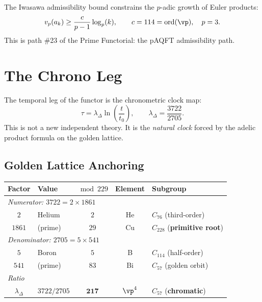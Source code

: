 The Iwasawa admissibility bound constrains the $p$-adic growth of Euler products:
\begin{equation}
v_p(a_k) \geq \frac{c}{p-1} \log_p(k), \qquad c = 114 = \mathrm{ord}(\vp), \quad p = 3.
\end{equation}
This is path \#23 of the Prime Functorial: the pAQFT admissibility path.


\section{The Chrono Leg}
\label{sec:chrono-leg}

The temporal leg of the functor is the chronometric clock map:
\begin{equation}
\tau = \lambda_\Delta \ln\!\left(\frac{t}{t_0}\right), \qquad \lambda_\Delta = \frac{3722}{2705}.
\end{equation}
This is not a new independent theory.  It is the \emph{natural clock} forced by the adelic product formula on the golden lattice.


\subsection{Golden Lattice Anchoring}

\begin{center}
\begin{tabular}{clccl}
\toprule
Factor & Value & $\bmod 229$ & Element & Subgroup \\
\midrule
\multicolumn{5}{l}{\textit{Numerator: $3722 = 2 \times 1861$}} \\
$2$    & Helium  & $2$  & He & $C_{76}$ (third-order) \\
$1861$ & (prime) & $29$ & Cu & $C_{228}$ (\textbf{primitive root}) \\
\midrule
\multicolumn{5}{l}{\textit{Denominator: $2705 = 5 \times 541$}} \\
$5$    & Boron   & $5$  & B  & $C_{114}$ (half-order) \\
$541$  & (prime) & $83$ & Bi & $C_{57}$ (golden orbit) \\
\midrule
\multicolumn{5}{l}{\textit{Ratio}} \\
$\lambda_\Delta$ & $3722/2705$ & $\mathbf{217}$ & $\vp^4$ & $C_{57}$ (\textbf{chromatic}) \\
\bottomrule
\end{tabular}
\end{center}

